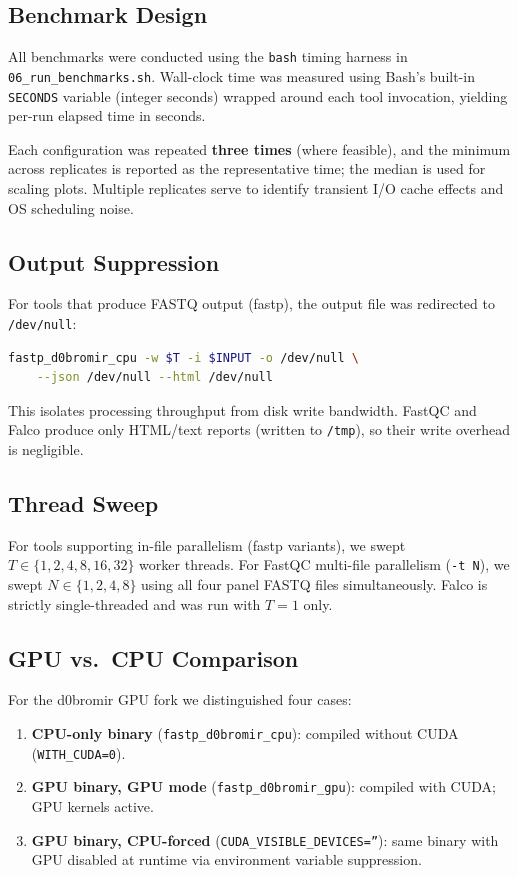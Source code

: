 \documentclass[a4paper,12pt]{article}
\begin{document}
\subsection{Benchmark Design}

All benchmarks were conducted using the \texttt{bash} timing harness in
\texttt{06\_run\_benchmarks.sh}.  Wall-clock time was measured using Bash's
built-in \texttt{SECONDS} variable (integer seconds) wrapped around each tool
invocation, yielding per-run elapsed time in seconds.

Each configuration was repeated \textbf{three times} (where feasible), and the
minimum across replicates is reported as the representative time; the median
is used for scaling plots.  Multiple replicates serve to identify transient
I/O cache effects and OS scheduling noise.

\subsection{Output Suppression}

For tools that produce FASTQ output (fastp), the output file was redirected to
\texttt{/dev/null}:

\begin{lstlisting}[language=bash]
fastp_d0bromir_cpu -w $T -i $INPUT -o /dev/null \
    --json /dev/null --html /dev/null
\end{lstlisting}

This isolates processing throughput from disk write bandwidth.  FastQC and
Falco produce only HTML/text reports (written to \texttt{/tmp}), so their
write overhead is negligible.

\subsection{Thread Sweep}

For tools supporting in-file parallelism (fastp variants), we swept $T \in
\{1, 2, 4, 8, 16, 32\}$ worker threads.  For FastQC multi-file parallelism
(\texttt{-t~N}), we swept $N \in \{1, 2, 4, 8\}$ using all four panel FASTQ
files simultaneously.  Falco is strictly single-threaded and was run with $T=1$
only.

\subsection{GPU vs.\ CPU Comparison}

For the d0bromir GPU fork we distinguished four cases:
\begin{enumerate}
  \item \textbf{CPU-only binary} (\texttt{fastp\_d0bromir\_cpu}): compiled
    without CUDA (\texttt{WITH\_CUDA=0}).
  \item \textbf{GPU binary, GPU mode} (\texttt{fastp\_d0bromir\_gpu}): compiled
    with CUDA; GPU kernels active.
  \item \textbf{GPU binary, CPU-forced} (\texttt{CUDA\_VISIBLE\_DEVICES=''}):
    same binary with GPU disabled at runtime via environment variable suppression.
\end{enumerate}
\end{document}
